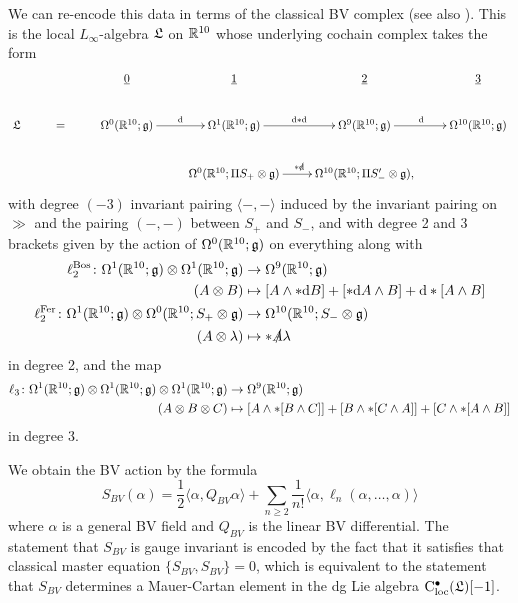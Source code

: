 \documentclass[10pt, oneside]{article}
\def\<{\langle}
\def\>{\rangle}
\def\cloc{{\rm C}_{\rm loc}}
\def\bu{\bullet}
\begin{document}
We can re-encode this data in terms of the classical BV complex (see also \cite[Section 3.1]{ElliottYoo1}).  
This is the local $L_\infty$-algebra $\mathfrak L$ on $\mathbb R^{10}$ whose underlying cochain complex takes the form
\[
\xymatrix{
& & \ul{0} & \ul{1} & \ul{2} & \ul{3} \\
\fL & = & \Omega^0(\RR^{10}; \gg) \ar[r]^{\d} &\Omega^1(\RR^{10}; \gg) \ar[r]^{\d \ast \d} &\Omega^9(\RR^{10}; \gg) \ar[r]^{\d} &\Omega^{10}(\RR^{10}; \gg) \\
& & &\Omega^0(\RR^{10}; \Pi S_+ \otimes \gg) \ar[r]^{\ast \sd \d} &\Omega^{10}(\RR^{10}; \Pi S'_- \otimes \gg), &
}\]
with degree $(-3)$ invariant pairing $\<-,-\>$ induced by the invariant pairing on $\gg$ and the pairing $(-,-)$ between $S_+$ and $S_-$, and with degree 2 and 3 brackets given by the action of $\Omega^0(\mathbb R^{10}; \mathfrak{g})$ on everything along with
\begin{align*}
\ell_2^{\mathrm{Bos}} \colon \Omega^1(\mathbb R^{10};\mathfrak{g}) \otimes \Omega^1(\mathbb R^{10};\mathfrak{g}) &\to \Omega^{9}(\mathbb R^{10};\mathfrak{g}) \\
(A \otimes B) &\mapsto [A \wedge \ast \mathrm{d} B] + [\ast \mathrm{d}  A \wedge B] + \mathrm{d} \ast[A \wedge B] \\
\ell_2^{\mathrm{Fer}} \colon \Omega^1(\mathbb R^{10};\mathfrak{g}) \otimes \Omega^0(\mathbb R^{10}; S_{+} \otimes \mathfrak{g}) &\to \Omega^{10}(\mathbb R^{10}; S_{-} \otimes \mathfrak{g}) \\
(A \otimes \lambda) &\mapsto \ast \slashed{A} \lambda
\end{align*}
in degree 2, and the map
\begin{align*}
\ell_3 \colon \Omega^1(\mathbb R^{10};\mathfrak{g}) \otimes \Omega^1(\mathbb R^{10};\mathfrak{g}) \otimes \Omega^1(\mathbb R^{10};\mathfrak{g}) &\to \Omega^{9}(\mathbb R^{10};\mathfrak{g}) \\
(A \otimes B \otimes C) &\mapsto [A \wedge \ast[B \wedge C]] + [B \wedge \ast[C \wedge A]] + [C \wedge \ast[A \wedge B]]
\end{align*}
in degree 3.

We obtain the BV action by the formula
\[
S_{BV} (\alpha) = \frac{1}{2} \<\alpha , Q_{BV} \alpha\> + \sum_{n \geq 2} \frac{1}{n!} \<\alpha, \ell_n(\alpha,\ldots, \alpha)\> 
\]
where $\alpha$ is a general BV field and $Q_{BV}$ is the linear BV differential. 
The statement that $S_{BV}$ is gauge invariant is encoded by the fact that it satisfies that classical master equation $\{S_{BV}, S_{BV}\} = 0$, which is equivalent to the statement that $S_{BV}$ determines a Mauer-Cartan element in the dg Lie algebra $\cloc^\bu(\fL)[-1]$. 
\end{document}
